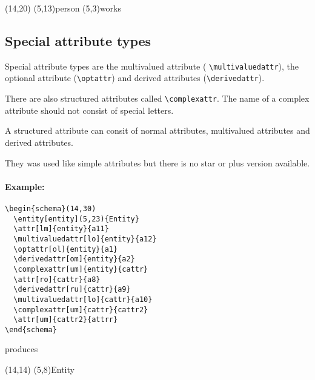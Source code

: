 \documentclass[a4paper,11pt]{article}
\begin{document}
\begin{schema}(14,20)
  \entity[Person](5,13){person}
  \relation[arbeitet](5,3){works}
\end{schema}

\subsection{Special attribute types}

Special attribute types are the multivalued attribute ( \verb|\multivaluedattr|),
the optional attribute (\verb|\optattr|) and derived attributes (\verb|\derivedattr|).

There are also structured attributes called \verb|\complexattr|. The name of a complex attribute
should not consist of special letters.

A structured attribute can consit of normal attributes, multivalued attributes and derived attributes.

They was used like simple attributes but there is no star or plus version available.

\paragraph{Example:}

\begin{verbatim}
\begin{schema}(14,30)
  \entity[entity](5,23){Entity}
  \attr[lm]{entity}{a11}
  \multivaluedattr[lo]{entity}{a12}
  \optattr[ol]{entity}{a1}
  \derivedattr[om]{entity}{a2}
  \complexattr[um]{entity}{cattr}
  \attr[ro]{cattr}{a8}
  \derivedattr[ru]{cattr}{a9}
  \multivaluedattr[lo]{cattr}{a10}
  \complexattr[um]{cattr}{cattr2}
  \attr[um]{cattr2}{attrr}
\end{schema}
\end{verbatim}

produces

\begin{schema}(14,14)
  \entity[entity](5,8){Entity}
\end{schema}
\end{document}
